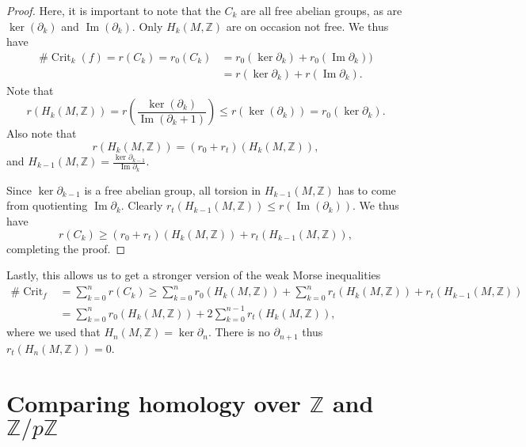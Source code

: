 \documentclass[a4paper]{article}
\newcommand\Z{\mathbb Z}
\DeclareMathOperator{\Crit}{Crit}
\DeclareMathOperator{\Ker}{ker}
\renewcommand{\Im}{\operatorname{Im}}
\begin{document}
\begin{proof}
    Here, it is important to note that the $C_k$ are all free abelian groups, as are  $\ker(\partial_k)$ and  $\Im(\partial_k)$. Only $H_k(M, \Z)$ are on occasion not free. We thus have 
    \begin{align*}
        \# \Crit_k(f) = r(C_k) = r_0(C_k)
        &= r_0(\ker \partial_k) + r_0(\Im \partial_k))\\
        &= r(\ker \partial_k) + r(\Im \partial_k) \tag{*}
    .\end{align*}
    Note that
    \[
        r(H_k(M, \Z)) = r\left( \frac{\ker (\partial_k)}{\Im (\partial_k+1)} \right) \le  r(\ker(\partial_k)) = r_0(\ker \partial_k)
    .\] 
    Also note that 
    \[
        r(H_k(M, \Z)) = (r_0 + r_t)(H_k(M, \Z))
    ,\] 
    and $H_{k-1}(M, \Z) = \frac{\Ker \partial_{k-1}}{\Im \partial_k}$.

    Since $\ker \partial_{k-1}$ is a free abelian group, all torsion in $H_{k-1}(M, \Z)$ has to come from quotienting $\Im \partial_k$.
    Clearly $r_t(H_{k-1}(M, \Z)) \le  r(\Im(\partial_k))$.
    We thus have
    \[
        r(C_k) \ge  (r_0 + r_t)(H_k(M, \Z)) + r_t(H_{k-1}(M, \Z)),
    \] 
    completing the proof.
\end{proof}

Lastly, this allows us to get a stronger version of the weak Morse inequalities
\begin{align*}
    \# \Crit_f &= \sum_{k=0}^{n} r(C_k) \ge  \sum_{k=0}^{n} r_0(H_k(M, \Z)) + \sum_{k=0}^{n}r_t(H_k(M, \Z)) + r_t(H_{k-1}(M, \Z))\\
               &= \sum_{k=0}^{n} r_0 (H_k(M, \Z)) + 2 \sum_{k=0}^{n-1} r_t(H_k(M, \Z))
,\end{align*} 
where we used that $H_n(M, \Z) = \ker \partial_n$. There is no $\partial_{n+1}$ thus $r_t(H_n(M, \Z)) = 0$.


\section{Comparing homology over $\Z$ and $\Z / p \Z$}
\end{document}

